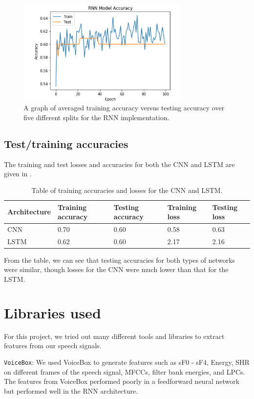 \documentclass{article}
\begin{document}
\begin{figure}[htb]
	\centering
	\includegraphics[width = 8.5cm]{figs/rnn_graph}
	\caption{A graph of averaged training accuracy versus testing accuracy over five different splits for the RNN implementation.}
	\label{fig:rnn_graph}
\end{figure}

\subsection{Test/training accuracies}
\label{subsec:tables}

The training and test losses and accuracies for both the CNN and LSTM are given in .
\begin{table}[h]
	\centering
	\begin{tabularx}{\linewidth}{|X|X|X|X|X|}
		\hline
		Ar\-chi\-tec\-ture & Training accuracy & Testing accuracy & Training loss & Testing loss \\
		\hline
		CNN & 0.70 & 0.60 & 0.58 & 0.63 \\
		\hline
		LSTM & 0.62 & 0.60 & 2.17 & 2.16 \\
		\hline
	\end{tabularx}
	\caption{Table of training accuracies and losses for the CNN and LSTM.}
	\label{tab:acc}
\end{table}
From the table, we can see that testing accuracies for both types of networks were similar, though losses for the CNN were much lower than that for the LSTM.

\section{Libraries used}
\label{sec:libraries}

For this project, we tried out many different tools and libraries to extract features from our speech signals.

\texttt{VoiceBox}: We used VoiceBox to generate features such as sF0 - sF4, Energy, SHR on different frames of the speech signal, MFCCs, filter bank energies, and LPCs.
The features from VoiceBox performed poorly in a  feedforward neural network but performed well in the RNN architecture.
\end{document}
